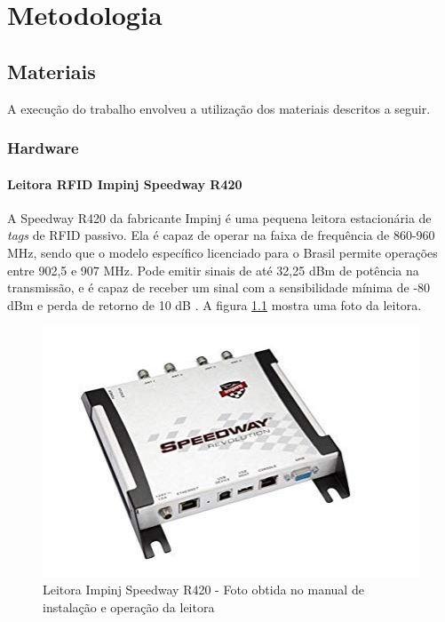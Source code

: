 
\chapter{Metodologia\label{chap:Metodos}}



\section{Materiais}

A execução do trabalho envolveu a utilização dos materiais descritos a seguir.

\subsection{Hardware}
\subsubsection{Leitora RFID Impinj Speedway R420}

A Speedway R420 da fabricante Impinj é uma pequena leitora estacionária de \textit{tags} de RFID passivo. Ela é capaz de operar na faixa de frequência de 860-960 MHz, sendo que o modelo específico licenciado para o Brasil permite operações entre 902,5 e 907 MHz. Pode emitir sinais de até 32,25 dBm de potência na transmissão, e é capaz de receber um sinal com a sensibilidade mínima de -80 dBm e perda de retorno de 10 dB \cite{SpeedwayRDatasheet} \cite{SpeedwayRUserManual} \cite{TG2013OliveiraERocha}. A figura \ref{fig:SpeedwayR420_first} mostra uma foto da leitora.

    \begin{figure}[H]
        \centering
        \includegraphics[width=0.55\linewidth]{figs/Metodologia/leitoraSpeedwayR420.jpg}
        \caption{Leitora Impinj Speedway R420 - Foto obtida no manual de instalação e operação da leitora \cite{SpeedwayRUserManual}}
        \label{fig:SpeedwayR420_first}
    \end{figure}


